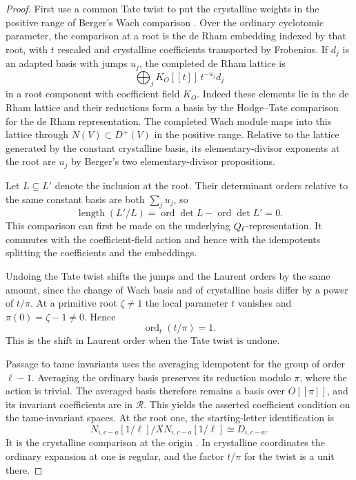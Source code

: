 \begin{proof}
First use a common Tate twist to put the
crystalline weights in the positive range of Berger's Wach
comparison \cite[Propositions II.2.1, II.3.1 and III.2.1]{berger-wach}.
Over the ordinary cyclotomic parameter, the comparison at a
root is the de Rham embedding indexed by that root, with
\(t\) rescaled and crystalline coefficients transported by
Frobenius. If \(d_j\) is an adapted basis with jumps \(u_j\), the completed de Rham lattice is
\[
 \bigoplus_j K_O[[t]]\,t^{-u_j}d_j
\]
in a root component with coefficient field \(K_O\). Indeed these elements lie in the de Rham
lattice and their reductions form a basis by the Hodge--Tate
comparison for the de Rham representation. The completed
Wach module maps into this lattice through
\(N(V)\subset D^+(V)\) in the positive range. Relative to the
lattice generated by the constant crystalline basis, its
elementary-divisor exponents at the root are \(u_j\) by
Berger's two elementary-divisor propositions.

Let \(L\subseteq L'\) denote the inclusion at the root. Their determinant orders relative to the same constant basis are both \(\sum_j u_j\), so
\[
 \operatorname{length}(L'/L)
  =\operatorname{ord}\det L-\operatorname{ord}\det L'=0.
\] This comparison
can first be made on the underlying \(Q_\ell\)-representation.
It commutes with the coefficient-field action and hence with
the idempotents splitting the coefficients and the embeddings.

Undoing the Tate twist shifts the jumps and the Laurent orders
by the same amount, since the change of Wach basis and of
crystalline basis differ by a power of \(t/\pi\). At a primitive root \(\zeta\ne1\) the local parameter \(t\) vanishes and \(\pi(0)=\zeta-1\ne0\). Hence
\[
 \operatorname{ord}_t(t/\pi)=1.
\]
This is the shift in Laurent order when the Tate twist is undone.

Passage to tame invariants
uses the averaging idempotent for the group of order
\(\ell-1\). Averaging the ordinary basis preserves its reduction
modulo \(\pi\), where the action is trivial. The averaged basis
therefore remains a basis over \(O[[\pi]]\), and its invariant
coefficients are in \(\mathcal R\). This yields the asserted
coefficient condition on the tame-invariant spaces. At the root one, the starting-letter identification is
\[
 N_{i,c-a}[1/\ell]/XN_{i,c-a}[1/\ell]\simeq D_{i,c-a}.
\]
It is the crystalline comparison at the origin
\cite[Corollary III.4.5]{berger-wach}. In crystalline
coordinates the ordinary expansion at one is regular, and
the factor \(t/\pi\) for the twist is a unit there.
\end{proof}

